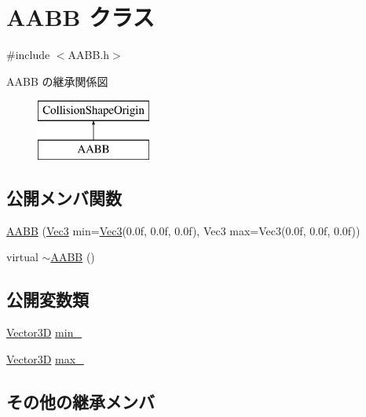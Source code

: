 \hypertarget{class_a_a_b_b}{}\section{A\+A\+BB クラス}
\label{class_a_a_b_b}


{\ttfamily \#include $<$A\+A\+B\+B.\+h$>$}

A\+A\+BB の継承関係図\begin{figure}[H]
\begin{center}
\leavevmode
\includegraphics[height=2.000000cm]{class_a_a_b_b}
\end{center}
\end{figure}
\subsection*{公開メンバ関数}
\begin{DoxyCompactItemize}
\item 
\mbox{\hyperlink{class_a_a_b_b_a409e2c536eb56fb3e3b1147f8478edea}{A\+A\+BB}} (\mbox{\hyperlink{_vector3_d_8h_ab16f59e4393f29a01ec8b9bbbabbe65d}{Vec3}} min=\mbox{\hyperlink{_vector3_d_8h_ab16f59e4393f29a01ec8b9bbbabbe65d}{Vec3}}(0.\+0f, 0.\+0f, 0.\+0f), Vec3 max=\+Vec3(0.\+0f, 0.\+0f, 0.\+0f))
\item 
virtual \mbox{\hyperlink{class_a_a_b_b_afd5f4956a2043597167ff66821f7b223}{$\sim$\+A\+A\+BB}} ()
\end{DoxyCompactItemize}
\subsection*{公開変数類}
\begin{DoxyCompactItemize}
\item 
\mbox{\hyperlink{class_vector3_d}{Vector3D}} \mbox{\hyperlink{class_a_a_b_b_a682f7bc02fc950a24ce8a8e512e4eb52}{min\+\_\+}}
\item 
\mbox{\hyperlink{class_vector3_d}{Vector3D}} \mbox{\hyperlink{class_a_a_b_b_a7f8dca79cab056729bde7139b219fcbe}{max\+\_\+}}
\end{DoxyCompactItemize}
\subsection*{その他の継承メンバ}


